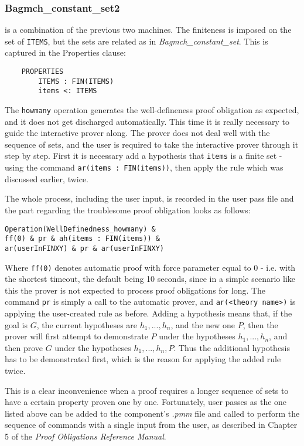 \documentclass[11pt,journal]{IEEEtran}
\begin{document}
	\subsubsection{Bagmch\_constant\_set2} is a combination of the previous two machines. The finiteness is imposed on the set of \texttt{ITEMS}, but the sets are related as in \emph{Bagmch\_constant\_set}. This is captured in the Properties clause:
	\begin{lstlisting}
	PROPERTIES
		ITEMS : FIN(ITEMS)
		items <: ITEMS 
	\end{lstlisting}
	The \texttt{howmany} operation generates the well-defineness proof obligation as expected, and it does not get discharged automatically. This time it is really necessary to guide the interactive prover along. The prover does not deal well with the sequence of sets, and the user is required to take the interactive prover through it step by step. First it is necessary add a hypothesis that \texttt{items} is a finite set - using the command \texttt{ar(items : FIN(items))}, then apply the rule which was discussed earlier, twice. 
	
	The whole process, including the user input, is recorded in the user pass file and the part regarding the troublesome proof obligation looks as follows:
	
	\begin{lstlisting}
Operation(WellDefinedness_howmany) & 
ff(0) & pr & ah(items : FIN(items)) &
ar(userInFINXY) & pr & ar(userInFINXY)
	\end{lstlisting}
	Where \texttt{ff(0)} denotes automatic proof with force parameter equal to 0 - i.e. with the shortest timeout, the default being 10 seconds, since in a simple scenario like this the prover is not expected to process proof obligations for long. The command \texttt{pr} is simply a call to the automatic prover, and \texttt{ar(<theory name>)} is applying the user-created rule as before. Adding a hypothesis means that, if the goal is $G$, the current hypotheses are $h_1, ..., h_n$, and the new one $P$, then the prover will first attempt to demonstrate $P$ under the hypotheses $h_1, ..., h_n$, and then prove $G$ under the hypotheses $h_1, ...,h_n, P$.\cite{PO reference}  Thus the additional hypothesis has to be demonstrated first, which is the reason for applying the added rule twice. 
	
	This is a clear inconvenience when a proof requires a longer sequence of sets to have a certain property proven one by one. Fortunately, user passes as the one listed above can be added to the component's \emph{.pmm} file and called to perform the sequence of commands with a single input from the user, as described in Chapter 5 of the \emph{Proof Obligations Reference Manual}.
	
\end{document}
